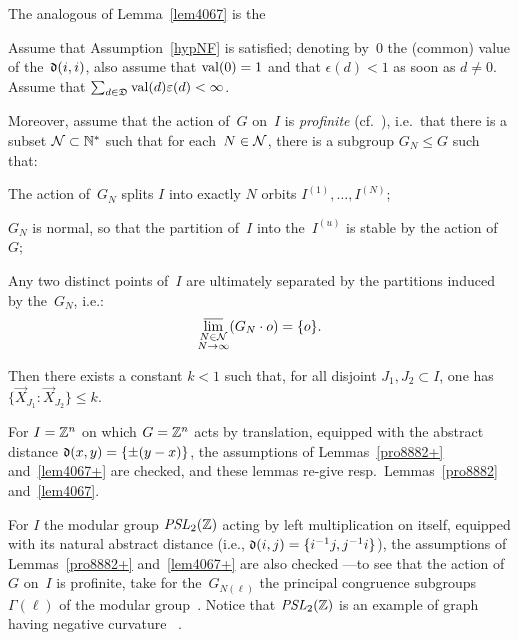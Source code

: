 The analogous of Lemma~\ref{lem4067} is the
%
\begin{Lem}\label{lem4067+}
Assume that Assumption~\ref{hypNF} is satisfied;
denoting by~$0$ the (common) value of the~$\mathfrak{d}(i,i)$,
also assume that $\operatorname{val}(0)=1$ and that $\epsilon(d) < 1$ as soon as $d \neq 0$.
Assume that $\sum_{d\in\mathfrak{D}} \operatorname{val}(d)\varepsilon(d) < \infty$.

Moreover, assume that the action of~$G$ on~$I$ is \emph{profinite}
(cf.~\cite[Definition~1.1]{profinite}), i.e.\ that
there is a subset $\mathcal{N} \subset \mathbb{N}^*$
such that for each~$N\in\mathcal{N}$, there is a subgroup $G_N \leq G$ such that:
%
\begin{ienumerate}
\item\label{itm4759} The action of~$G_N$ splits $I$ into exactly $N$ orbits
$I^{(1)},\ldots,I^{(N)}$;
\item\label{itm4518} $G_N$ is normal,
so that the partition of~$I$ into the~$I^{(u)}$ is stable by the action of~$G$;
\item\label{itm4750} Any two distinct points of~$I$ are ultimately separated
by the partitions induced by the~$G_N$, i.e.:
\[ \varlimsup_{\substack{N\in\mathcal{N}\\N\to\infty}} (G_{N}\cdot o) = \{o\} .\]
\end{ienumerate}

Then there exists a constant $k<1$ such that, for all disjoint
$J_1,J_2\subset I$, one has $\{\vec{X}_{J_1}:\vec{X}_{J_2}\} \leq k$.
\end{Lem}

\begin{Xpl}
For $I=\mathbb{Z}^n$ on which $G=\mathbb{Z}^n$ acts by translation,
equipped with the abstract distance $\mathfrak{d}(x,y) = \{\pm(y-x)\}$,
the assumptions of Lemmas~\ref{pro8882+} and~\ref{lem4067+} are checked,
and these lemmas re-give resp.\ Lemmas~\ref{pro8882} and~\ref{lem4067}.
\end{Xpl}

\begin{Xpl}\label{x3339}
For $I$ the modular group $\mathit{PSL}_2(\mathbb{Z})$ acting by left multiplication on itself,
equipped with its natural abstract distance (i.e., $\mathfrak{d}(i,j) = \{i^{-1}j,j^{-1}i\}$),
the assumptions of Lemmas~\ref{pro8882+} and~\ref{lem4067+} are also checked%
—to see that the action of~$G$ on~$I$ is profinite,
take for the~$G_{N(\ell)}$ the principal congruence subgroups
$\Gamma(\ell)$ of the modular group~\cite{PSL2Z}.
%
Notice that $\mathit{PSL}_2(\mathbb{Z})$ is an example of graph having negative curvature%
~\cite{Gromov}.
\end{Xpl}




